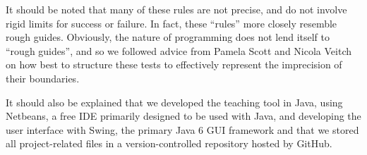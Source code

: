 It should be noted that many of these rules are not precise, and do
not involve rigid limits for success or failure.
In fact, these ``rules'' more closely resemble rough guides.
Obviously, the nature of programming does not lend itself to ``rough
guides'', and so we followed advice from Pamela Scott and Nicola
Veitch on how best to structure these tests to effectively represent
the imprecision of their boundaries.

It should also be explained that we developed the teaching tool
in Java, using Netbeans, a free IDE primarily designed to be used with
Java, and developing the user interface with Swing, the primary Java 6
GUI framework and that we stored all project-related files in a
version-controlled repository hosted by GitHub.

